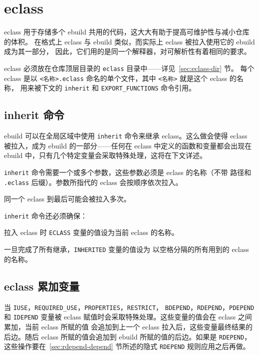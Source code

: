 \chapter{eclass}
\label{ch:eclasses}

eclass 用于存储多个 ebuild 共用的代码，这大大有助于提高可维护性与减小仓库的体积。
在格式上 eclass 与 ebuild 类似，而实际上 eclass 被拉入使用它的 ebuild 成为其一部分，
因此，它们用的是同一个解释器，对可解析性有着相同的要求。

eclass 必须放在仓库顶层目录的 \texttt{eclass} 目录中——详见~\ref{sec:eclass-dir} 节。
每个 eclass 是以 \texttt{<\hspace{0em}\nolinebreak 名称\hspace{0em}\nolinebreak>.eclass}
命名的单个文件，其中 \texttt{<\hspace{0em}名称\hspace{0em}>} 就是这个 eclass 的名称，
用来被下文的 \texttt{inherit} 和 \texttt{EXPORT_FUNCTIONS} 命令引用。

\section{inherit 命令}
\label{sec:inherit}

ebuild 可以在全局区域中使用 \texttt{inherit} 命令来继承 eclass。这么做会使得 eclass
被拉入，成为 ebuild 的一部分——任何在 eclass 中定义的函数和变量都会出现在 ebuild
中，只有几个特定变量会采取特殊处理，这将在下文详述。

\texttt{inherit} 命令需要一个或多个参数，这些参数必须是 eclass 的名称（不带
路径和 \texttt{.eclass} 后缀）。参数所指代的 eclass 会按顺序依次拉入。

同一个 eclass 到最后可能会被拉入多次。

\texttt{inherit} 命令还必须确保：

\begin{compactitem}
\item 拉入 eclass 时 \texttt{ECLASS} 变量的值设为当前 eclass 的名称。
\item 一旦完成了所有继承，\texttt{INHERITED} 变量的值设为
    以空格分隔的所有用到的 eclass 的名称。
\end{compactitem}

\section{eclass 累加变量}

当 \texttt{IUSE}，\texttt{REQUIRED_USE}，\texttt{PROPERTIES}，\texttt{RESTRICT}，
\texttt{BDEPEND}，\texttt{RDEPEND}，\texttt{PDEPEND} 和 \texttt{IDEPEND} 变量被
eclass 赋值时会采取特殊处理。这些变量的值会在 eclass 之间累加，当前 eclass 所赋的值
会追加到上一个 eclass 拉入后，这些变量最终结果的后边。随后 eclass 所赋的值会追加到
ebuild 所赋的值的后边。如果是 \texttt{RDEPEND}，这些操作要在~\ref{sec:rdepend-depend}
节所述的隐式 \texttt{RDEPEND} 规则应用之后再做。

